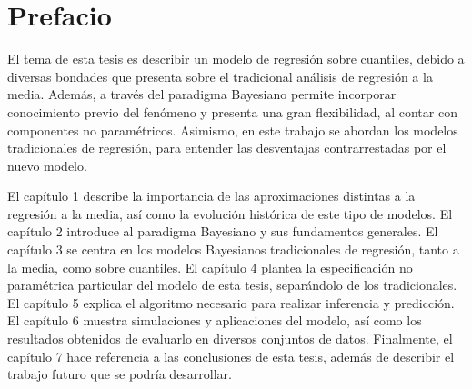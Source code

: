 \pagestyle{plain}
\chapter*{Prefacio}


El tema de esta tesis es describir un modelo de regresi\'on sobre cuantiles, debido a diversas bondades que presenta sobre el tradicional an\'alisis de regresi\'on a la media. Adem\'as, a través del paradigma Bayesiano permite incorporar conocimiento previo del fen\'omeno y presenta una gran flexibilidad, al contar con componentes no param\'etricos. Asimismo, en este trabajo se abordan los modelos tradicionales de regresi\'on, para entender las desventajas contrarrestadas por el nuevo modelo.

El cap\'itulo 1 describe la importancia de las aproximaciones distintas a la regresi\'on a la media, así como la evoluci\'on hist\'orica de este tipo de modelos. El cap\'itulo 2 introduce al paradigma Bayesiano y sus fundamentos generales. El cap\'itulo 3 se centra en los modelos Bayesianos tradicionales de regresi\'on, tanto a la media, como sobre cuantiles. El cap\'itulo 4 plantea la especificaci\'on no param\'etrica particular del modelo de esta tesis, separ\'andolo de los tradicionales. El cap\'itulo 5 explica el algoritmo necesario para realizar inferencia y predicci\'on. El cap\'itulo 6 muestra simulaciones y aplicaciones del modelo, as\'i como los resultados obtenidos de evaluarlo en diversos conjuntos de datos. Finalmente, el cap\'itulo 7 hace referencia a las conclusiones de esta tesis, adem\'as de describir el trabajo futuro que se podr\'ia desarrollar.